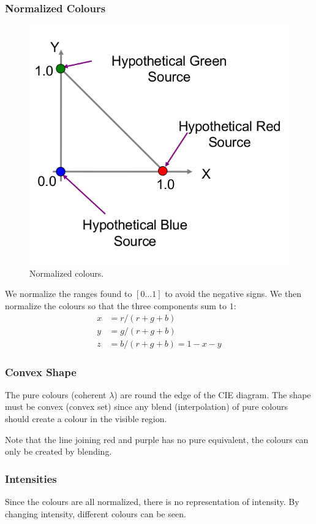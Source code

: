 \documentclass[11pt]{article}
\begin{document}
\subsubsection{Normalized Colours}
\begin{figure}[htb!]
  \centering
  \caption{Normalized colours.}
  \includegraphics[scale=0.3]{normalizedcolours}
\end{figure}
We normalize the ranges found to $[0\dots1]$ to avoid the negative signs.
We then normalize the colours so that the three components sum to $1$:
\begin{align*}
  x &= r / (r + g + b) \\
  y &= g / (r + g + b) \\
  z &= b / (r + g + b) = 1 - x - y
\end{align*}

\subsubsection{Convex Shape}
The pure colours (coherent $\lambda$) are round the edge of the CIE diagram.
The shape must be convex (convex set) since any blend (interpolation) of pure colours should create a colour in the visible region.

Note that the line joining red and purple has no pure equivalent, the colours can only be created by blending.

\subsubsection{Intensities}
Since the colours are all normalized, there is no representation of intensity.
By changing intensity, different colours can be seen.
\end{document}
